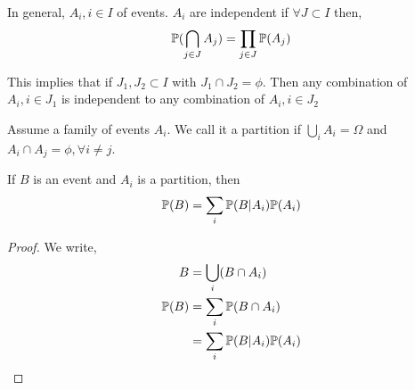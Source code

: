 \begin{prop}
    In general, $A_i, i \in I$ of events.  $A_i$ are independent if  $\forall J \subset I$ then, 
    $$ \P( \bigcap_{j \in J} A_j) = \prod_{j \in J} \P(A_j) $$ 
\end{prop}

\begin{note}
    This implies that if $J_1, J_2 \subset I$ with $J_1 \cap J_2 = \phi$. Then  any combination of  $A_i, i \in J_1$ is independent to any combination of $A_i, i \in J_2$
\end{note}




\vspace{1em}
\hline
\vspace{1em}


\begin{definition}[Parition]
Assume a family of events $A_i$. We call it a partition if $\bigcup_i A_i = \Omega$ and  $A_i \cap A_j = \phi, \forall i \ne j$.
\end{definition}

\begin{theorem}
    If $B$ is an event and $A_i$ is a partition, then 
    $$ \P(B) = \sum_i \P(B | A_i) \P(A_i) $$ 
\end{theorem}
\begin{proof}

    We write,
    \begin{align*}
    B &= \bigcup_i( B \cap  A_i)\\
    \P(B) &= \sum_i \P( B \cap  A_i)\\
         &= \sum_i \P( B |  A_i) \P(A_i)\\
    \end{align*}
\end{proof}

